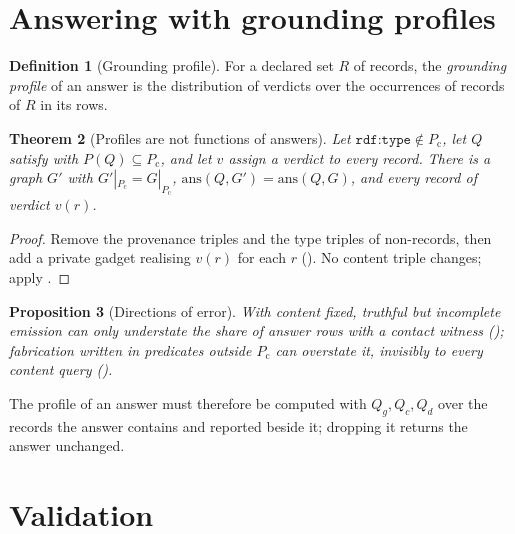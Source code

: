 \documentclass[11pt,twocolumn,a4paper]{article}
\theoremstyle{plain}
\newtheorem{theorem}{Theorem}[section]
\newtheorem{proposition}[theorem]{Proposition}
\theoremstyle{definition}
\newtheorem{definition}[theorem]{Definition}
\theoremstyle{remark}
\newcommand{\G}{G}
\newcommand{\Pc}{P_{\mathrm{c}}}
\newcommand{\ans}{\mathrm{ans}}
\newcommand{\rdftype}{\texttt{rdf:type}}
\begin{document}
\section{Answering with grounding profiles}
\label{sec:answering}

\begin{definition}[Grounding profile]
\label{def:profile}
For a declared set $R$ of records, the \emph{grounding profile} of an answer is
the distribution of verdicts over the occurrences of records of $R$ in its rows.
\end{definition}

\begin{theorem}[Profiles are not functions of answers]
\label{thm:profilefree}
Let $\rdftype\notin\Pc$, let $Q$ satisfy  with
$P(Q)\subseteq\Pc$, and let $v$ assign a verdict to every record. There is a
graph $\G'$ with $\G'|_{\Pc}=\G|_{\Pc}$, $\ans(Q,\G')=\ans(Q,\G)$, and every
record of verdict $v(r)$.
\end{theorem}

\begin{proof}
Remove the provenance triples and the type triples of non-records, then add a
private gadget realising $v(r)$ for each $r$ (). No
content triple changes; apply .
\end{proof}

\begin{proposition}[Directions of error]
\label{prop:directions}
With content fixed, truthful but incomplete emission can only understate the
share of answer rows with a contact witness (); fabrication
written in predicates outside $\Pc$ can overstate it, invisibly to every
content query ().
\end{proposition}

The profile of an answer must therefore be computed with $Q_g,Q_c,Q_d$ over the
records the answer contains and reported beside it; dropping it returns the
answer unchanged.

\section{Validation}
\label{sec:validation}
\end{document}
